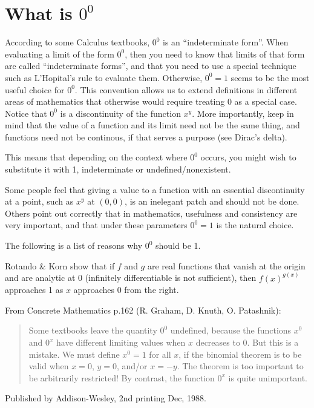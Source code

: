 \section{What is $0^0$}

  According to some Calculus textbooks, $0^0$ is an ``indeterminate
    form''. When evaluating a limit of the form $0^0$, then you need
    to know that limits of that form are called ``indeterminate forms'',
    and that you need to use a special technique such as L'Hopital's
    rule to evaluate them. Otherwise, $0^0=1$ seems to be the most
    useful choice for $0^0$. This convention allows us to extend
    definitions in different areas of mathematics that otherwise would
    require treating 0 as a special case. Notice that $0^0$ is a
    discontinuity of the function $x^y$. More importantly, keep
    in mind that the value of a function and its limit need not be the
    same thing, and functions need not be continous, if that serves
    a purpose (see Dirac's delta).



    This means that depending on the context where $0^0$ occurs, you
    might wish to substitute it with 1, indeterminate or
    undefined/nonexistent.

    Some people feel that giving a value to a function with an
    essential discontinuity at a point, such as $x^y$ at $(0,0)$, is
    an inelegant patch and should not be done. Others point out
    correctly that in mathematics, usefulness and consistency are
    very important, and that under these parameters $0^0=1$ is
    the natural choice.

    The following is a list of reasons why $0^0$ should be 1.

    Rotando \& Korn show that if $f$ and $g$ are real functions that vanish
    at the origin and are analytic at 0 (infinitely differentiable is
    not sufficient), then $f(x)^{g(x)}$ approaches 1 as $x$ approaches 0 from
    the right.

    From Concrete Mathematics p.162 (R. Graham, D. Knuth, O. Patashnik):
\begin{quote}
    Some textbooks leave the quantity $0^0$ undefined, because the
    functions $x^0$ and $0^x$ have different limiting values when $x$
    decreases to 0. But this is a mistake. We must define
       $x^0 = 1$ for all $x$,
    if the binomial theorem is to be valid when $x=0$, $y=0$, and/or $x=-y$.
    The theorem is too important to be arbitrarily restricted! By
    contrast, the function $0^x$ is quite unimportant.
\end{quote}
   Published by Addison-Wesley, 2nd printing Dec, 1988.

